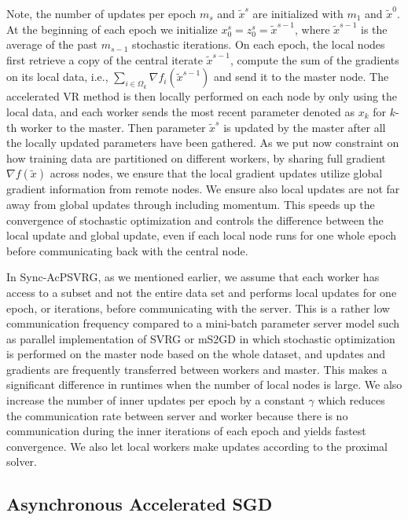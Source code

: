 {Note, the number of updates per epoch $m_s$ and $\widetilde{x}^s$ are initialized with $m_1$ and $\widetilde{x}^0$. At the beginning of each epoch we initialize $x_0^s=z_0^s=\widetilde{x}^{s-1}$, where $\widetilde{x}^{s-1}$ is the average of the past $m_{s-1}$ stochastic iterations.} On  each  epoch,  the  local  nodes  first  retrieve  a  copy of  the  central  iterate $\widetilde{x}^{s-1}$, compute the sum of the gradients on its local data, i.e., $\sum_{i\in\Omega_k}{\nabla f_i{(\widetilde{x}^{s-1})}}$ and send it to the master node. The accelerated VR method is then locally performed on each node by only using the local data, and each worker sends the most recent parameter denoted as ${x}_k$ for $k$-th worker to the master. Then parameter $\widetilde{x}^s$ is updated by the master after all the locally updated parameters have been gathered. As we put now constraint on how training data are partitioned on different workers, by sharing full gradient $\nabla f(\widetilde{x})$ across nodes, we ensure  that  the  local  gradient  updates  utilize  global  gradient information from remote nodes. We ensure also local updates are not far away from global updates through including momentum. This speeds up the convergence of stochastic optimization and controls the difference between the local update and global update, even if each local  node  runs  for  one  whole  epoch  before  communicating back with the central node. 

In Sync-AcPSVRG, as we mentioned earlier, we assume that each worker has access to a subset and not the entire data set and performs local updates for one epoch, or iterations, before communicating with
the  server. This  is  a  rather  low  communication  frequency
compared  to  a mini-batch parameter  server  model such as parallel implementation of SVRG \cite{Zhao2014} or mS2GD \cite{Konecny2016} in which stochastic optimization is performed on the master node based on the whole dataset, and updates and gradients are frequently transferred between workers and master. This  makes  a  significant  difference  in  runtimes  when  the
number of local nodes is large.
 We also increase the number of inner updates per epoch by a constant $\gamma$ which reduces the communication rate between server and worker because there is no communication during the inner iterations of each epoch and yields fastest convergence. We also let local workers make updates according to the proximal solver.

\subsection{Asynchronous Accelerated SGD}

